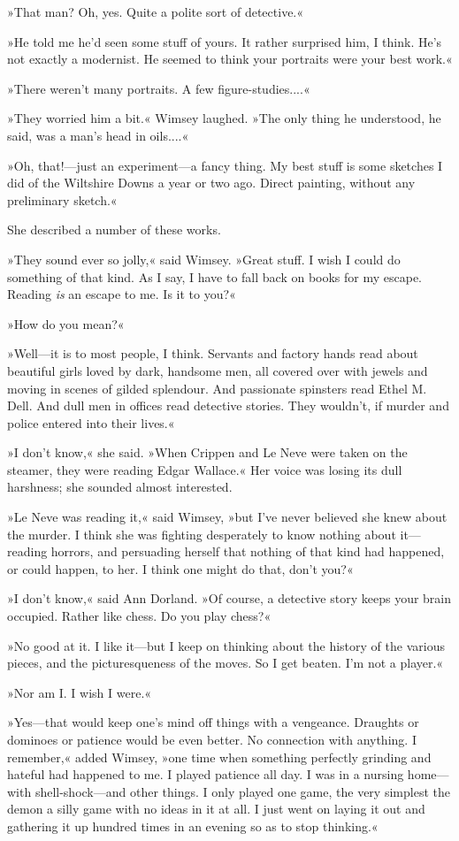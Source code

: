 »That man? Oh, yes. Quite a polite sort of detective.«

»He told me he'd seen some stuff of yours. It rather surprised him, I think. He's not exactly a modernist. He seemed to think your portraits were your best work.«

»There weren't many portraits. A few figure-studies....«

»They worried him a bit.« Wimsey laughed. »The only thing he understood, he said, was a man's head in oils....«

»Oh, that!—just an experiment—a fancy thing. My best stuff is some sketches I did of the Wiltshire Downs a year or two ago. Direct painting, without any preliminary sketch.«

She described a number of these works.

»They sound ever so jolly,« said Wimsey. »Great stuff. I wish I could do something of that kind. As I say, I have to fall back on books for my escape. Reading \textit{is} an escape to me. Is it to you?«

»How do you mean?«

»Well—it is to most people, I think. Servants and factory hands read about beautiful girls loved by dark, handsome men, all covered over with jewels and moving in scenes of gilded splendour. And passionate spinsters read Ethel M. Dell. And dull men in offices read detective stories. They wouldn't, if murder and police entered into their lives.«

»I don't know,« she said. »When Crippen and Le Neve were taken on the steamer, they were reading Edgar Wallace.« Her voice was losing its dull harshness; she sounded almost interested.

»Le Neve was reading it,« said Wimsey, »but I've never believed she knew about the murder. I think she was fighting desperately to know nothing about it—reading horrors, and persuading herself that nothing of that kind had happened, or could happen, to her. I think one might do that, don't you?«

»I don't know,« said Ann Dorland. »Of course, a detective story keeps your brain occupied. Rather like chess. Do you play chess?«

»No good at it. I like it—but I keep on thinking about the history of the various pieces, and the picturesqueness of the moves. So I get beaten. I'm not a player.«

»Nor am I. I wish I were.«

»Yes—that would keep one's mind off things with a vengeance. Draughts or dominoes or patience would be even better. No connection with anything. I remember,« added Wimsey, »one time when something perfectly grinding and hateful had happened to me. I played patience all day. I was in a nursing home—with shell-shock—and other things. I only played one game, the very simplest \textellipsis  the demon \textellipsis  a silly game with no ideas in it at all. I just went on laying it out and gathering it up \textellipsis  hundred times in an evening \textellipsis  so as to stop thinking.«

